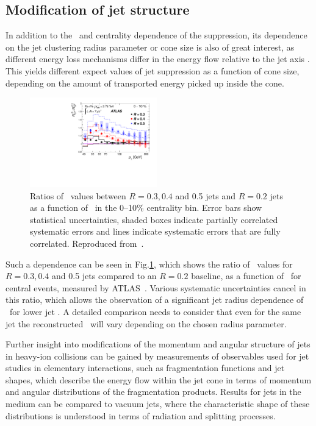 \subsection{Modification of jet structure}

In addition to the \pT\ and centrality dependence of the suppression, its dependence on the 
jet clustering radius parameter or cone size is also of great interest, as 
different energy loss mechanisms differ in the energy flow relative to the 
jet axis \cite{Vitev:2008rz, Vitev:2009rd,He:2011pd}. This yields different
expect values of jet suppression as a function of cone size, depending
on the amount of transported energy picked up inside the cone.
\begin{figure}[!th]
\begin{center}
\includegraphics[width=0.49\textwidth]{jetfigures/ATLAS_jetRCP_size.pdf}
\caption{
Ratios of \Rcp\ values between $R = 0.3, 0.4$ and 0.5 jets and $R =
0.2$ jets as a function of \pT\ in the 0--10\% centrality bin.
Error bars show statistical uncertainties, shaded boxes
indicate partially correlated systematic errors and lines indicate
systematic errors that are fully correlated.
Reproduced from~\cite{Aad:2012is}.
}
\label{fig:GR:ATLAS_jetRCP_size}
\end{center}
\end{figure}

Such a dependence can be seen in Fig.\ref{fig:GR:ATLAS_jetRCP_size}, which
shows the ratio of \Rcp\ values for $R = 0.3, 0.4$ and 0.5 jets compared
to an $R = 0.2$ baseline, as a function of \pT\ for central events,
measured by ATLAS~\cite{Aad:2012is}.
Various systematic uncertainties cancel in this ratio, which allows 
the observation of a significant jet radius dependence of \Rcp\ 
for lower jet \pT. A detailed comparison needs to consider 
that even for the same jet the reconstructed \pT\ will vary 
depending on the chosen radius parameter.

Further insight into modifications of the momentum and angular structure
of jets in heavy-ion collisions can be gained by measurements of
observables used for jet studies in elementary interactions, such as
fragmentation functions and jet shapes, which describe the energy flow 
within the jet cone in terms of momentum and angular distributions 
of the fragmentation products.  Results for jets in the medium can
be compared to vacuum jets, where the characteristic shape of these
distributions is understood in terms of radiation and splitting 
processes.

